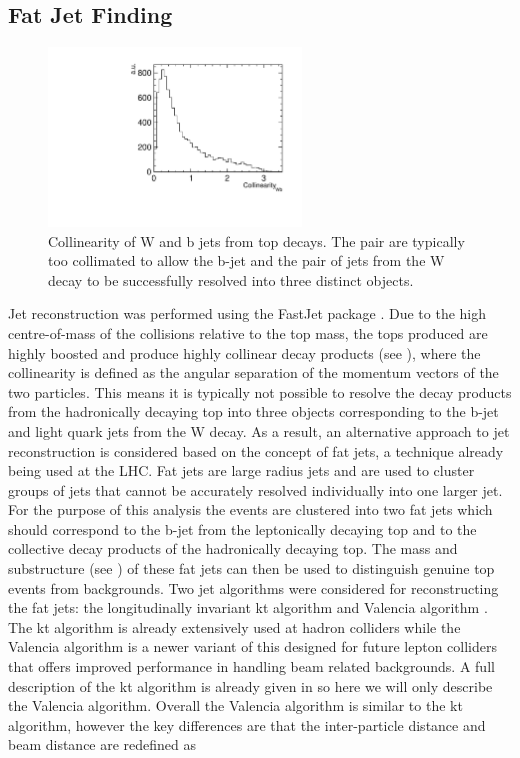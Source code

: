 \subsection{Fat Jet Finding}

\begin{figure}
  \centering
  \includegraphics[width=0.6\textwidth]{TopAnalysis/figures/WBCollinearityAlt2.pdf}
  \caption[Collinearity W and b jet from top decay]{Collinearity of W and b jets from top decays. The pair are typically too collimated to allow the b-jet and the pair of jets from the W decay to be successfully resolved into three distinct objects. }
  \label{fig:Collimated}
\end{figure}

Jet reconstruction was performed using the FastJet package \cite{Cacciari:2011ma}. Due to the high centre-of-mass of the collisions relative to the top mass, the tops produced are highly boosted and produce highly collinear decay products (see ), where the collinearity is defined as the angular separation of the momentum vectors of the two particles. This means it is typically not possible to resolve the decay products from the hadronically decaying top into three objects corresponding to the b-jet and light quark jets from the W decay. As a result, an alternative approach to jet reconstruction is considered based on the concept of fat jets, a technique already being used at the LHC\cite{Miller:2011qg}. Fat jets are large radius jets and are used to cluster groups of jets that cannot be accurately resolved individually into one larger jet. For the purpose of this analysis the events are clustered into two fat jets which should correspond to the b-jet from the leptonically decaying top and to the collective decay products of the hadronically decaying top. The mass and substructure (see ) of these fat jets can then be used to distinguish genuine top events from backgrounds. Two jet algorithms were considered for reconstructing the fat jets: the longitudinally invariant kt algorithm \cite{Cacciari:2008gp} and Valencia algorithm \cite{Boronat:2014hva}. The kt algorithm is already extensively used at hadron colliders while the Valencia algorithm is a newer variant of this designed for future lepton colliders that offers improved performance in handling beam related backgrounds. A full description of the kt algorithm is already given in  so here we will only describe the Valencia algorithm. Overall the Valencia algorithm is similar to the kt algorithm, however the key differences are that the inter-particle distance and beam distance are redefined as

